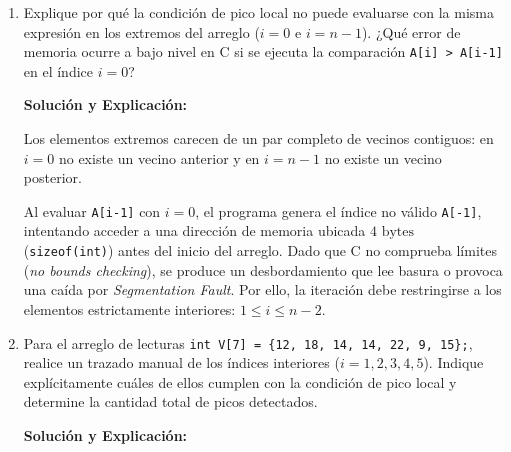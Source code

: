 \documentclass[11pt,letterpaper]{article}
\begin{document}
\begin{enumerate}[label=\textbf{\arabic*.}]
    \begin{enumerate}[label=(\alph*)]
        \item Explique por qué la condición de pico local no puede evaluarse con la misma expresión en los extremos del arreglo ($i = 0$ e $i = n - 1$). ¿Qué error de memoria ocurre a bajo nivel en C si se ejecuta la comparación \texttt{A[i] > A[i-1]} en el índice $i = 0$?

        \begin{solucionbox}
        \textbf{Solución y Explicación:}
        
        \noindent Los elementos extremos carecen de un par completo de vecinos contiguos: en $i=0$ no existe un vecino anterior y en $i=n-1$ no existe un vecino posterior.
        
        \noindent Al evaluar \texttt{A[i-1]} con $i=0$, el programa genera el índice no válido \texttt{A[-1]}, intentando acceder a una dirección de memoria ubicada $4\text{ bytes}$ (\texttt{sizeof(int)}) antes del inicio del arreglo. Dado que C no comprueba límites (\textit{no bounds checking}), se produce un desbordamiento que lee basura o provoca una caída por \textit{Segmentation Fault}. Por ello, la iteración debe restringirse a los elementos estrictamente interiores: $1 \le i \le n - 2$.
        \end{solucionbox}

        \vspace{0.3cm}
        \item Para el arreglo de lecturas \texttt{int V[7] = \{12, 18, 14, 14, 22, 9, 15\};}, realice un trazado manual de los índices interiores ($i = 1, 2, 3, 4, 5$). Indique explícitamente cuáles de ellos cumplen con la condición de pico local y determine la cantidad total de picos detectados.

        \begin{solucionbox}
        \textbf{Solución y Explicación:}
        

\end{solucionbox}
\end{enumerate}
\end{enumerate}
\end{document}

